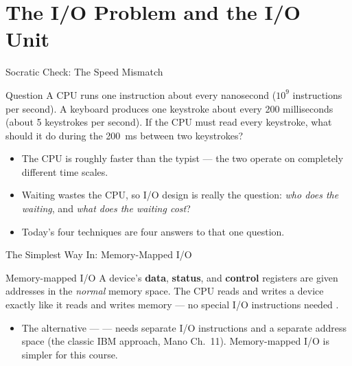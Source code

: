 \documentclass[aspectratio=169]{beamer}
\begin{document}

\section{The I/O Problem and the I/O Unit}

\begin{frame}{Socratic Check: The Speed Mismatch}
  \begin{block}{Question}
    A CPU runs one instruction about every nanosecond ($10^9$ instructions
    per second). A keyboard produces one keystroke about every 200
    milliseconds (about 5 keystrokes per second). If the CPU must read every
    keystroke, what should it do during the 200~ms between two keystrokes?
  \end{block}
  \begin{itemize}
    \item The CPU is roughly  faster than the typist
      --- the two operate on completely different time scales.
    \item Waiting wastes the CPU, so I/O design is really the question:
      \emph{who does the waiting}, and \emph{what does the waiting cost}?
    \item Today's four techniques are four answers to that one question.
  \end{itemize}
\end{frame}

\begin{frame}{The Simplest Way In: Memory-Mapped I/O}
  \begin{block}{Memory-mapped I/O}
    A device's \textbf{data}, \textbf{status}, and \textbf{control} registers
    are given addresses in the \emph{normal} memory space. The CPU reads and
    writes a device exactly like it reads and writes memory --- no special
    I/O instructions needed \cite{Hamacher2002_computer_organization}.
  \end{block}
  \begin{itemize}
    \item The alternative ---  --- needs separate I/O
      instructions and a separate address space (the classic IBM
      approach, Mano Ch.~11). Memory-mapped I/O is simpler for this course.
  \end{itemize}
\end{frame}
\end{document}
